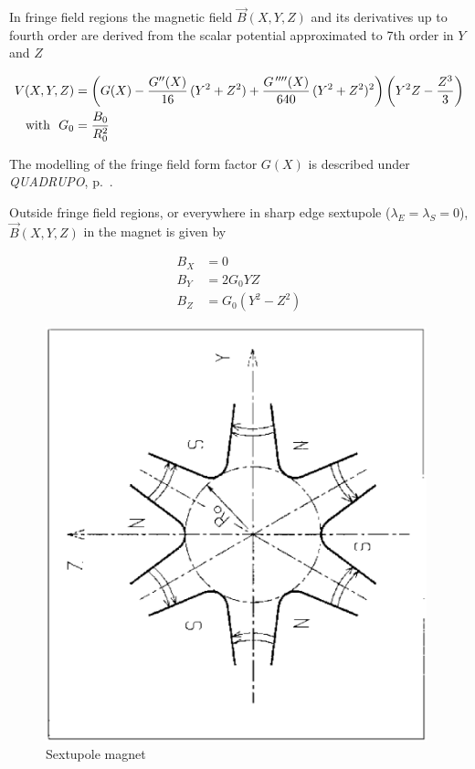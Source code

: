 {\noindent In fringe field regions the magnetic field $ \vec  B(X,Y,Z) $ and
its derivatives up to fourth order are derived from the scalar potential approximated to 
7th order in $ Y $ and $ Z $

 \begin{align*}
 	V(X,Y,Z)    & =   \left(G(X)- \dfrac{G^{\prime\prime}(X) }{ 16}\, (Y^2+Z^2)+
	             \dfrac{G^{\,\prime\prime\prime\prime}(X) }{ 640}\, (Y^2+Z^2)^2\right) 
	             \left(Y^2Z-\dfrac{Z^3 }{ 3} \right)   \\
\text{with } ~ G_0 &   =  \dfrac{ B_0}{ R^2_0}
\end{align*}

\noindent The  modelling of the fringe field form factor  $G(X)$
 is described under \textsl{QUADRUPO}, p.~\pageref{QUADRUPO}. 

\medskip


\noindent Outside fringe field regions, or everywhere in sharp edge sextupole 
($ \lambda_E=\lambda_ S=0$),   $ \vec  B(X,Y,Z) $ in the magnet is given by 

\begin{align*}
	B_X &   =     0 \\
	B_Y &   =    2G_0YZ \\
	B_Z &   =     G_0(Y^2-Z^2)  
\end{align*}
\vfill

\begin{figure}[H]
\centerline{\includegraphics[height=12cm,angle=-90]{Fig29.ps}}
\caption{\label{fig29}Sextupole magnet}
\end{figure}
\vfill



}
